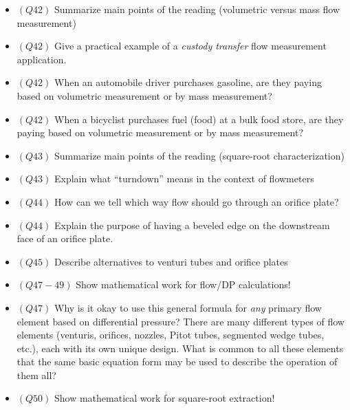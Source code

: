 \begin{itemize}
\begin{itemize}
\begin{itemize}
\item{$(Q42)$} Summarize main points of the reading (volumetric versus mass flow measurement)
\item{$(Q42)$} Give a practical example of a {\it custody transfer} flow measurement application.
\item{$(Q42)$} When an automobile driver purchases gasoline, are they paying based on volumetric measurement or by mass measurement?
\item{$(Q42)$} When a bicyclist purchases fuel (food) at a bulk food store, are they paying based on volumetric measurement or by mass measurement?
\item{$(Q43)$} Summarize main points of the reading (square-root characterization)
\item{$(Q43)$} Explain what ``turndown'' means in the context of flowmeters
\item{$(Q44)$} How can we tell which way flow should go through an orifice plate?
\item{$(Q44)$} Explain the purpose of having a beveled edge on the downstream face of an orifice plate.
\item{$(Q45)$} Describe alternatives to venturi tubes and orifice plates
\item{$(Q47-49)$} Show mathematical work for flow/DP calculations!
\item{$(Q47)$} Why is it okay to use this general formula for {\it any} primary flow element based on differential pressure?  There are many different types of flow elements (venturis, orifices, nozzles, Pitot tubes, segmented wedge tubes, etc.), each with its own unique design.  What is common to all these elements that the same basic equation form may be used to describe the operation of them all?
\item{$(Q50)$} Show mathematical work for square-root extraction!
\medskip


\end{itemize}
\end{itemize}
\end{itemize}
